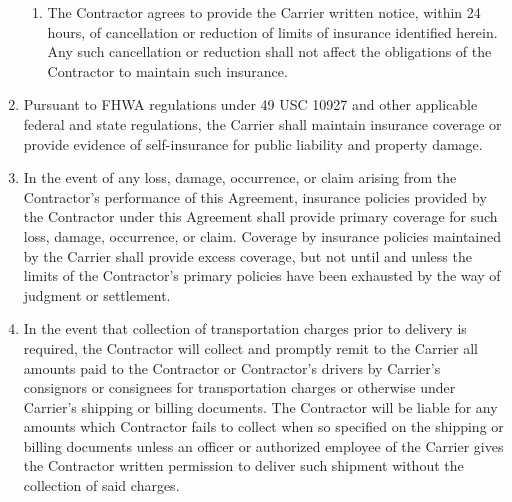 \begin{enumerate}
\begin{enumerate}
        \item The Contractor agrees to provide the Carrier written notice,
        within 24 hours, of cancellation or reduction of limits of
        insurance identified herein. Any such cancellation or reduction
        shall not affect the obligations of the Contractor to maintain such
        insurance.
    \end{enumerate}

    \item Pursuant to FHWA regulations under 49 USC 10927 and other
    applicable federal and state regulations, the Carrier shall maintain
    insurance coverage or provide evidence of self-insurance for public
    liability and property damage.

    \item In the event of any loss, damage, occurrence, or claim arising
    from the Contractor's performance of this Agreement, insurance policies
    provided by the Contractor under this Agreement shall provide primary
    coverage for such loss, damage, occurrence, or claim. Coverage by
    insurance policies maintained by the Carrier shall provide excess
    coverage, but not until and unless the limits of the Contractor's
    primary policies have been exhausted by the way of judgment or
    settlement.

    \item In the event that collection of transportation charges prior to
    delivery is required, the Contractor will collect and promptly remit to
    the Carrier all amounts paid to the Contractor or Contractor's drivers
    by Carrier's consignors or consignees for transportation charges or
    otherwise under Carrier's shipping or billing documents. The Contractor
    will be liable for any amounts which Contractor fails to collect when
    so specified on the shipping or billing documents unless an officer or
    authorized employee of the Carrier gives the Contractor written
    permission to deliver such shipment without the collection of said
    charges.
\end{enumerate}